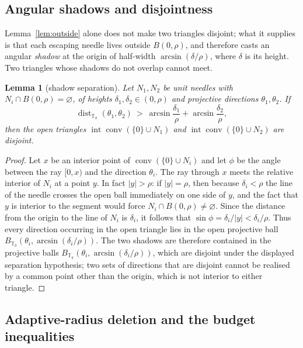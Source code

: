 \documentclass[11pt]{article}
\theoremstyle{plain}
\newtheorem{lemma}[theorem]{Lemma}
\theoremstyle{definition}
\theoremstyle{remark}
\newcommand{\Tp}{\mathbb{T}_{\pi}}
\newcommand{\conv}{\operatorname{conv}}
\begin{document}
\subsection{Angular shadows and disjointness}

Lemma~\ref{lem:outside} alone does not make two triangles disjoint; what it
supplies is that each escaping needle lives outside $B(0,\rho)$, and therefore
casts an angular \emph{shadow} at the origin of half-width
$\arcsin(\delta/\rho)$, where $\delta$ is its height. Two triangles whose
shadows do not overlap cannot meet.

\begin{lemma}[shadow separation]\label{lem:shadow}
Let $N_{1},N_{2}$ be unit needles with $N_{i}\cap B(0,\rho)=\varnothing$, of
heights $\delta_{1},\delta_{2}\in(0,\rho)$ and projective directions
$\theta_{1},\theta_{2}$. If
\[
  \operatorname{dist}_{\Tp}(\theta_{1},\theta_{2})
  \ >\ \arcsin\frac{\delta_{1}}{\rho}+\arcsin\frac{\delta_{2}}{\rho},
\]
then the open triangles $\operatorname{int}\conv(\{0\}\cup N_{1})$ and
$\operatorname{int}\conv(\{0\}\cup N_{2})$ are disjoint.
\end{lemma}

\begin{proof}
Let $x$ be an interior point of $\conv(\{0\}\cup N_{i})$ and let $\phi$ be the
angle between the ray $[0,x)$ and the direction $\theta_{i}$. The ray through
$x$ meets the relative interior of $N_i$ at a point $y$. In fact $|y|>\rho$:
if $|y|=\rho$, then because $\delta_i<\rho$ the line of the needle crosses the
open ball immediately on one side of $y$, and the fact that $y$ is interior to
the segment would force $N_i\cap B(0,\rho)\ne\varnothing$. Since the distance
from the origin to the line of $N_i$ is $\delta_i$, it follows that
$\sin\phi=\delta_i/|y|<\delta_i/\rho$. Thus every direction occurring in the
open triangle lies in the open projective ball
$B_{\Tp}(\theta_i,\arcsin(\delta_i/\rho))$. The two shadows are therefore
contained in the projective balls $B_{\Tp}(\theta_{i},\arcsin(\delta_{i}/\rho))$,
which are disjoint under the displayed separation hypothesis; two sets of
directions that are disjoint cannot be realised by a common point other than the
origin, which is not interior to either triangle.
\end{proof}

\subsection{Adaptive-radius deletion and the budget inequalities}
\end{document}

